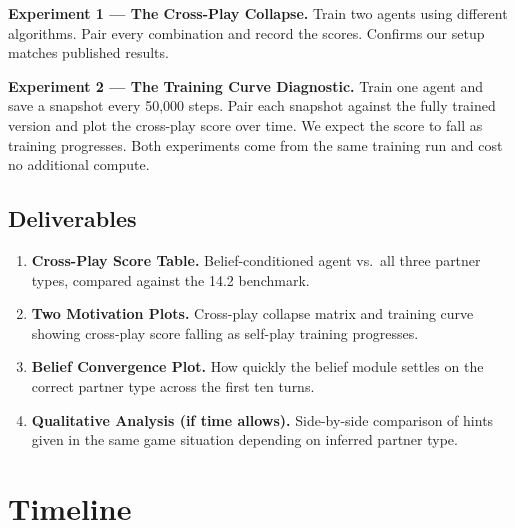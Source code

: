 \documentclass[11pt, a4paper]{article}
\begin{document}
\textbf{Experiment 1 --- The Cross-Play Collapse.} Train two agents using different algorithms. Pair every combination and record the scores. Confirms our setup matches published results.

\textbf{Experiment 2 --- The Training Curve Diagnostic.} Train one agent and save a snapshot every 50,000 steps. Pair each snapshot against the fully trained version and plot the cross-play score over time. We expect the score to fall as training progresses. Both experiments come from the same training run and cost no additional compute.

\subsection{Deliverables}

\begin{enumerate}[leftmargin=*, label=\textbf{\arabic*.}]
    \item \textbf{Cross-Play Score Table.} Belief-conditioned agent vs.\ all three partner types, compared against the 14.2 benchmark.
    \item \textbf{Two Motivation Plots.} Cross-play collapse matrix and training curve showing cross-play score falling as self-play training progresses.
    \item \textbf{Belief Convergence Plot.} How quickly the belief module settles on the correct partner type across the first ten turns.
    \item \textbf{Qualitative Analysis (if time allows).} Side-by-side comparison of hints given in the same game situation depending on inferred partner type.
\end{enumerate}

\section{Timeline}
\end{document}

